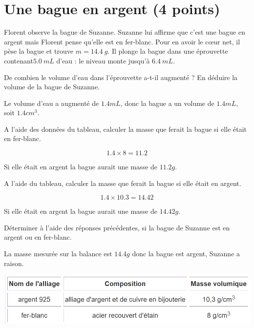 \section{Une bague en argent (4 points)}\label{ex:bague}

Florent observe la bague de Suzanne. Suzanne lui affirme que c'est une bague en argent mais Florent pense qu'elle est en fer-blanc. Pour en avoir le c\oe ur net, il pèse la bague et trouve $m = \num{14.4} \ g$. Il plonge la bague dans une éprouvette contenant$ \num{5.0} \ mL$ d'eau : le niveau monte jusqu'à $\num{6.4} \ mL$.  

\begin{questions}
	\question[1] De combien le volume d'eau dans l'éprouvette a-t-il augmenté ? En déduire la volume de la bague de Suzanne.
	\begin{solution}
		Le volume d'eau a augmenté de $\num{1.4} mL$, donc la bague a un volume de $\num{1.4} mL$, soit $\num{1.4} cm^3.$
	\end{solution}
	
	\question[1] A l'aide des données du tableau, calculer la masse que ferait la bague si elle était en fer-blanc.
	\begin{solution}
		\begin{equation*}
		\num{1.4} \times \num{8} = \num{11,2} 
		\end{equation*}
		
		Si elle était en argent la bague aurait une masse de $\num{11,2} g$. 
	\end{solution}
	
	\question[1] A l'aide du tableau, calculer la masse que ferait la bague si elle était en argent.
	\begin{solution}
		\begin{equation*}
		\num{1.4} \times \num{10.3} = \num{14,42} 
		\end{equation*}
		
		Si elle était en argent la bague aurait une masse de $\num{14,42} g$. 
	\end{solution}
	
	\question[1] Déterminer à l'aide des réponses précédentes, si la bague de Suzanne est en argent ou en fer-blanc.
	\begin{solution}
		La masse mesurée sur la balance est $\num{14,4} g$ donc la bague est argent, Suzanne a raison.
	\end{solution}

\end{questions}

\begin{center}
	\includegraphics[scale=0.5]{img/tableau}
\end{center}
